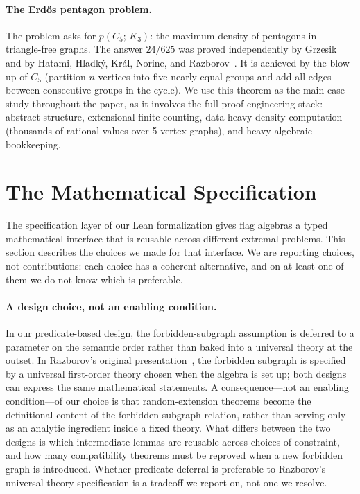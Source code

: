 \documentclass{article}
\newcommand{\tdensity}[2]{p(#1;\,#2)}
\begin{document}
\paragraph{The Erd\H{o}s pentagon problem.}
The problem asks for $\tdensity{C_5}{K_3}$: the maximum density of
pentagons in triangle-free graphs.  The answer $24/625$ was proved
independently by Grzesik~\cite{grzesik2012} and by Hatami, Hladk\'y, Kr\'al,
Norine, and Razborov~\cite{hatami2012}.  It is achieved by the blow-up of
$C_5$ (partition $n$ vertices into five nearly-equal groups and add all edges
between consecutive groups in the cycle).  We use this theorem as the main
case study throughout the paper, as it involves the full proof-engineering
stack: abstract structure, extensional finite counting, data-heavy density
computation (thousands of rational values over 5-vertex graphs), and heavy
algebraic bookkeeping.


\section{The Mathematical Specification}
\label{sec:abstract}

The specification layer of our Lean formalization gives flag algebras a
typed mathematical interface that is reusable across different extremal
problems.  This section describes the choices we made for that interface.
We are reporting choices, not contributions: each choice has a coherent
alternative, and on at least one of them we do not know which is preferable.

\paragraph{A design choice, not an enabling condition.}
In our predicate-based design, the forbidden-subgraph assumption is deferred
to a parameter on the semantic order rather than baked into a universal theory
at the outset.  In Razborov's original presentation~\cite{razborov2007flag},
the forbidden subgraph is specified by a universal first-order theory chosen
when the algebra is set up; both designs can express the same mathematical
statements.  A consequence---not an enabling condition---of our choice is
that random-extension theorems become the definitional content of the
forbidden-subgraph relation, rather than serving only as an analytic
ingredient inside a fixed theory.  What differs between the two designs is
which intermediate lemmas are reusable across choices of constraint, and how
many compatibility theorems must be reproved when a new forbidden graph is
introduced.  Whether predicate-deferral is preferable to Razborov's
universal-theory specification is a tradeoff we report on, not one we resolve.
\end{document}
